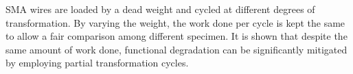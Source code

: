 \documentclass[12pt, a4paper]{article}
\begin{document}
SMA wires are loaded by a dead weight and cycled at different degrees of transformation. By varying the weight, the work done per cycle is kept the same to allow a fair comparison among different specimen. It is shown that despite the same amount of work done, functional degradation can be significantly mitigated by employing partial transformation cycles.
\end{document}
